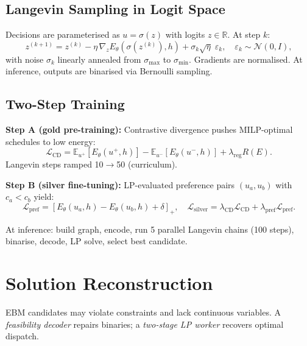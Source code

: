 \documentclass{article}
\begin{document}
\subsection{Langevin Sampling in Logit Space}

Decisions are parameterised as $u = \sigma(z)$ with logits $z \in \mathbb{R}$. At step $k$:
\begin{equation}
z^{(k+1)} = z^{(k)} - \eta\,\nabla_z E_\theta(\sigma(z^{(k)}), h) + \sigma_k \sqrt{\eta}\;\varepsilon_k, \quad \varepsilon_k \sim \mathcal{N}(0, I),
\end{equation}
with noise $\sigma_k$ linearly annealed from $\sigma_{\max}$ to $\sigma_{\min}$. Gradients are normalised. At inference, outputs are binarised via Bernoulli sampling.

\subsection{Two-Step Training}

\textbf{Step A (gold pre-training):} Contrastive divergence pushes MILP-optimal schedules to low energy:
\begin{equation}
\mathcal{L}_{\mathrm{CD}} = \mathbb{E}_{u^+}[E_\theta(u^+, h)] - \mathbb{E}_{u^-}[E_\theta(u^-, h)] + \lambda_{\mathrm{reg}} R(E).
\end{equation}
Langevin steps ramped 10$\to$50 (curriculum).

\textbf{Step B (silver fine-tuning):} LP-evaluated preference pairs $(u_a, u_b)$ with $c_a < c_b$ yield:
\begin{equation}
\mathcal{L}_{\mathrm{pref}} = [E_\theta(u_a, h) - E_\theta(u_b, h) + \delta]_+, \quad
\mathcal{L}_{\mathrm{silver}} = \lambda_{\mathrm{CD}} \mathcal{L}_{\mathrm{CD}} + \lambda_{\mathrm{pref}} \mathcal{L}_{\mathrm{pref}}.
\end{equation}

At inference: build graph, encode, run 5 parallel Langevin chains (100 steps), binarise, decode, LP solve, select best candidate.


\section{Solution Reconstruction}
\label{sec:reconstruction}

EBM candidates may violate constraints and lack continuous variables. A \emph{feasibility decoder} repairs binaries; a \emph{two-stage LP worker} recovers optimal dispatch.
\end{document}

